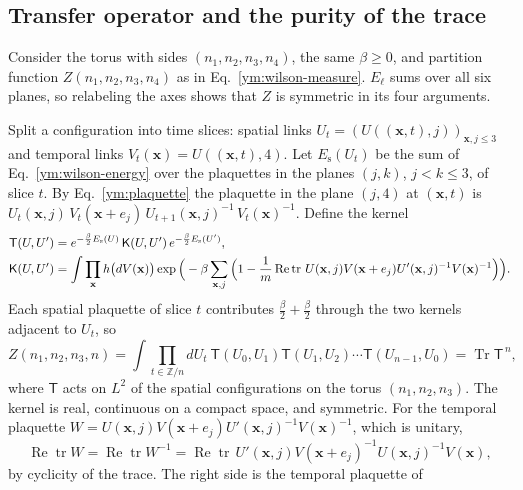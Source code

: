 \subsection{Transfer operator and the purity of the trace}
Consider the torus with sides $(n_1,n_2,n_3,n_4)$, the same $\beta\ge0$, and
partition function $Z(n_1,n_2,n_3,n_4)$ as in
Eq.~\eqref{ym:wilson-measure}. $E_\ell$ sums over all six planes, so
relabeling the axes shows that $Z$ is symmetric in its four arguments.

Split a configuration into time slices: spatial links
$U_t=(U((\mathbf x,t),j))_{\mathbf x,j\le3}$ and temporal links
$V_t(\mathbf x)=U((\mathbf x,t),4)$. Let $E_{\mathrm s}(U_t)$ be the sum of
Eq.~\eqref{ym:wilson-energy} over the plaquettes in the planes $(j,k)$,
$j<k\le3$, of slice $t$. By Eq.~\eqref{ym:plaquette} the plaquette in the
plane $(j,4)$ at $(\mathbf x,t)$ is
$U_t(\mathbf x,j)\,V_t(\mathbf x+e_j)\,U_{t+1}(\mathbf x,j)^{-1}\,V_t(\mathbf
x)^{-1}$. Define the kernel
\begin{align}
 \mathsf T(U,U')&=e^{-\frac\beta2E_{\mathrm s}(U)}\,\mathsf K(U,U')\,
 e^{-\frac\beta2E_{\mathrm s}(U')},\label{ym:transfer-kernel}\\
 \mathsf K(U,U')&=\int\prod_{\mathbf x}h\big(dV(\mathbf x)\big)
 \exp\Big(-\beta\sum_{\mathbf x,j}\Big(1-\frac1m\operatorname{Re}
 \operatorname{tr}\,U(\mathbf x,j)V(\mathbf x+e_j)U'(\mathbf x,j)^{-1}
 V(\mathbf x)^{-1}\Big)\Big).\notag
\end{align}
Each spatial plaquette of slice $t$ contributes
$\frac\beta2+\frac\beta2$ through the two kernels adjacent to $U_t$, so
\begin{equation}\label{ym:trace-formula}
 Z(n_1,n_2,n_3,n)=\int\prod_{t\in\mathbb Z/n}dU_t\
 \mathsf T(U_0,U_1)\mathsf T(U_1,U_2)\cdots\mathsf T(U_{n-1},U_0)
 =\operatorname{Tr}\mathsf T^{\,n},
\end{equation}
where $\mathsf T$ acts on $L^2$ of the spatial configurations on the torus
$(n_1,n_2,n_3)$. The kernel is real, continuous on a compact space, and
symmetric. For the temporal plaquette
$W=U(\mathbf x,j)V(\mathbf x+e_j)U'(\mathbf x,j)^{-1}V(\mathbf x)^{-1}$, which
is unitary,
\begin{equation}\label{ym:kernel-symmetry}
 \operatorname{Re}\operatorname{tr}W=\operatorname{Re}\operatorname{tr}W^{-1}
 =\operatorname{Re}\operatorname{tr}\,U'(\mathbf x,j)V(\mathbf x+e_j)^{-1}
 U(\mathbf x,j)^{-1}V(\mathbf x),
\end{equation}
by cyclicity of the trace. The right side is the temporal plaquette of
